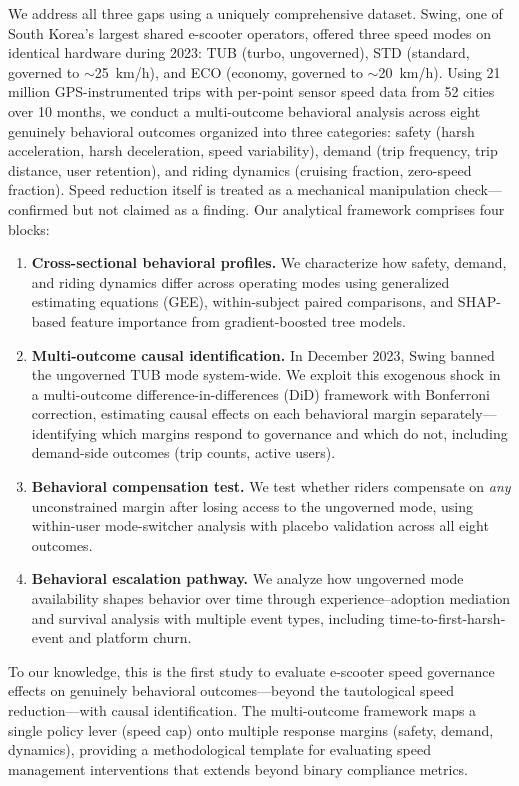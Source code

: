 We address all three gaps using a uniquely comprehensive dataset. Swing, one of South Korea's largest shared e-scooter operators, offered three speed modes on identical hardware during 2023: TUB (turbo, ungoverned), STD (standard, governed to $\sim$25~km/h), and ECO (economy, governed to $\sim$20~km/h). Using 21 million GPS-instrumented trips with per-point sensor speed data from 52 cities over 10 months, we conduct a multi-outcome behavioral analysis across eight genuinely behavioral outcomes organized into three categories: safety (harsh acceleration, harsh deceleration, speed variability), demand (trip frequency, trip distance, user retention), and riding dynamics (cruising fraction, zero-speed fraction). Speed reduction itself is treated as a mechanical manipulation check---confirmed but not claimed as a finding. Our analytical framework comprises four blocks:

\begin{enumerate}
    \item \textbf{Cross-sectional behavioral profiles.} We characterize how safety, demand, and riding dynamics differ across operating modes using generalized estimating equations (GEE), within-subject paired comparisons, and SHAP-based feature importance from gradient-boosted tree models.

    \item \textbf{Multi-outcome causal identification.} In December 2023, Swing banned the ungoverned TUB mode system-wide. We exploit this exogenous shock in a multi-outcome difference-in-differences (DiD) framework with Bonferroni correction, estimating causal effects on each behavioral margin separately---identifying which margins respond to governance and which do not, including demand-side outcomes (trip counts, active users).

    \item \textbf{Behavioral compensation test.} We test whether riders compensate on \textit{any} unconstrained margin after losing access to the ungoverned mode, using within-user mode-switcher analysis with placebo validation across all eight outcomes.

    \item \textbf{Behavioral escalation pathway.} We analyze how ungoverned mode availability shapes behavior over time through experience--adoption mediation and survival analysis with multiple event types, including time-to-first-harsh-event and platform churn.
\end{enumerate}

To our knowledge, this is the first study to evaluate e-scooter speed governance effects on genuinely behavioral outcomes---beyond the tautological speed reduction---with causal identification. The multi-outcome framework maps a single policy lever (speed cap) onto multiple response margins (safety, demand, dynamics), providing a methodological template for evaluating speed management interventions that extends beyond binary compliance metrics.
